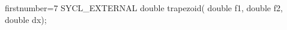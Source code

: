 \begin{ccode*}{firstnumber=7}
SYCL_EXTERNAL double trapezoid(
  double f1, double f2, double dx);
\end{ccode*}
